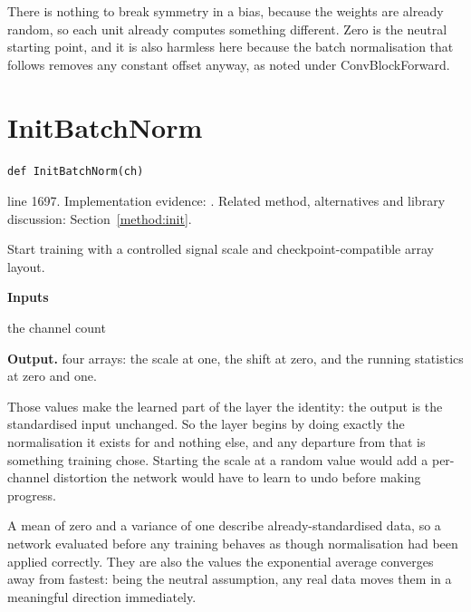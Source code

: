 There is nothing to break symmetry in a bias, because the weights are already random, so each unit already computes something different. Zero is the neutral starting point, and it is also harmless here because the batch normalisation that follows removes any constant offset anyway, as noted under ConvBlockForward.



\section{InitBatchNorm}\label{fn:train:InitBatchNorm}
\begin{lstlisting}[style=sig]
def InitBatchNorm(ch)
\end{lstlisting}
 line 1697. Implementation evidence: \cite{code2026}. Related method, alternatives and library discussion: Section~\ref{method:init}.


Start training with a controlled signal scale and checkpoint-compatible array layout.




\noindent\textbf{Inputs}
\begin{description}[leftmargin=2.2em,style=nextline,font=\normalfont\ttfamily]\setlength\itemsep{1pt}
  \item[{ch}] \normalfont the channel count
\end{description}

\noindent\textbf{Output.} four arrays: the scale at one, the shift at zero, and the running statistics at zero and one.


Those values make the learned part of the layer the identity: the output is the standardised input unchanged. So the layer begins by doing exactly the normalisation it exists for and nothing else, and any departure from that is something training chose. Starting the scale at a random value would add a per-channel distortion the network would have to learn to undo before making progress.


A mean of zero and a variance of one describe already-standardised data, so a network evaluated before any training behaves as though normalisation had been applied correctly. They are also the values the exponential average converges away from fastest: being the neutral assumption, any real data moves them in a meaningful direction immediately.


